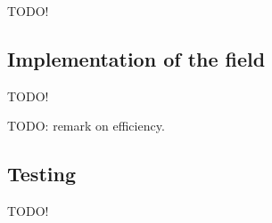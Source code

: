 
TODO!


\subsection{Implementation of the field}
\label{sub:field-impl}
TODO!

TODO: remark on efficiency.

\subsection{Testing}
\label{sub:field-test}
TODO!